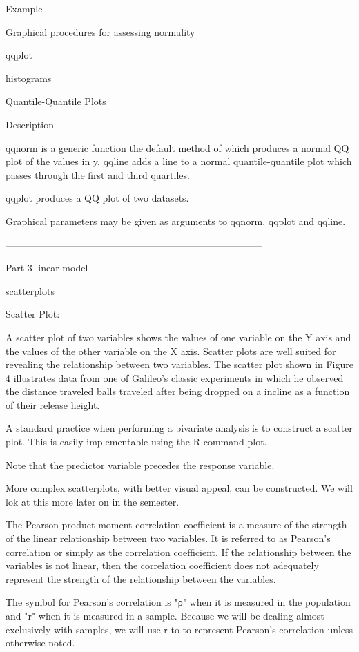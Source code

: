 Example

 Graphical procedures for assessing normality

qqplot

histograms


Quantile-Quantile Plots

Description

qqnorm is a generic function the default method of which produces a normal QQ plot of the values in y. qqline adds a line to a normal quantile-quantile plot which passes through the first and third quartiles.

qqplot produces a QQ plot of two datasets.

Graphical parameters may be given as arguments to qqnorm, qqplot and qqline.



--------------------------------------------------------------------------------


Part 3 linear model

scatterplots


Scatter Plot:

 A scatter plot of two variables shows the values of one variable on the Y axis and the values of the other variable on the X axis. Scatter plots are well suited for revealing the relationship between two variables. The scatter plot shown in Figure 4 illustrates data from one of Galileo's classic experiments in which he observed the distance traveled balls traveled after being dropped on a incline as a function of their release height.



A standard practice when performing a bivariate analysis is to construct a scatter plot. This is easily implementable using the R command plot.

Note that the predictor variable precedes the response variable.

More complex scatterplots, with better visual appeal, can be constructed. We will lok at this more later on in the semester.


The Pearson product-moment correlation coefficient is a measure of the strength of the linear relationship between two variables. It is referred to as Pearson's correlation or simply as the correlation coefficient. If the relationship between the variables is not linear, then the correlation coefficient does not adequately represent the strength of the relationship between the variables.

The symbol for Pearson's correlation is "ρ" when it is measured in the population and "r" when it is measured in a sample. Because we will be dealing almost exclusively with samples, we will use r to to represent Pearson's correlation unless otherwise noted.

